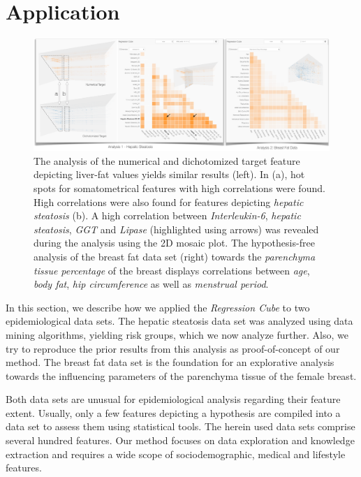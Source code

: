 \documentclass[journal]{style/vgtc} 			          %
\begin{document}
\section{Application} \label{application}
\begin{figure}[htb]
 \centering
 \includegraphics[width=7.0in]{figures/application}
 \caption{
 The analysis of the numerical and dichotomized target feature depicting liver-fat values yields similar results (left).
 In (a), hot spots for somatometrical features with high correlations were found.
 High correlations were also found for features depicting \emph{hepatic steatosis} (b).
 A high correlation between \emph{Interleukin-6}, \emph{hepatic steatosis}, \emph{GGT} and \emph{Lipase} (highlighted using arrows) was revealed during the analysis using the 2D mosaic plot.
 The hypothesis-free analysis of the breast fat data set (right) towards the \emph{parenchyma tissue percentage} of the breast displays correlations between \emph{age}, \emph{body fat}, \emph{hip circumference} as well as \emph{menstrual period}.
 }
  \label{fig:Application}
\end{figure}
In this section, we describe how we applied the \emph{Regression Cube} to two epidemiological data sets.
The hepatic steatosis data set was analyzed using data mining algorithms, yielding risk groups, which we now analyze further.
Also, we try to reproduce the prior results from this analysis as proof-of-concept of our method.
The breast fat data set is the foundation for an explorative analysis towards the influencing parameters of the parenchyma tissue of the female breast.

Both data sets are unusual for epidemiological analysis regarding their feature extent.
Usually, only a few features depicting a hypothesis are compiled into a data set to assess them using statistical tools.
The herein used data sets comprise several hundred features.
Our method focuses on data exploration and knowledge extraction and requires a wide scope of sociodemographic, medical and lifestyle features.
\end{document}
